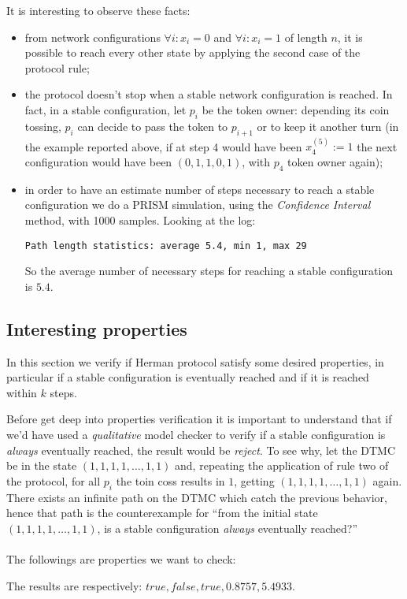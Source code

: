 It is interesting to observe these facts:
\begin{itemize}
\item from network configurations $\forall i:x_i=0$ and $\forall
  i:x_i=1$ of length $n$, it is possible to reach every other state by
  applying the second case of the protocol rule;
\item the protocol doesn't stop when a stable network configuration is
  reached. In fact, in a stable configuration, let $p_i$ be the token
  owner: depending its coin tossing, $p_i$ can decide to pass the
  token to $p_{i+1}$ or to keep it another turn (in the example
  reported above, if at step 4 would have been $x_4^{(5)}:= 1$ the
  next configuration would have been $(0, 1, 1, 0, 1)$, with $p_4$
  token owner again);
\item in order to have an estimate number of steps necessary to reach
  a stable configuration we do a PRISM simulation, using the
  \emph{Confidence Interval} method, with 1000 samples. Looking at the
  log:
\begin{verbatim}
Path length statistics: average 5.4, min 1, max 29
\end{verbatim}
  So the average number of necessary steps for reaching a stable
  configuration is $5.4$.
\end{itemize}

\subsection{Interesting properties}

In this section we verify if Herman protocol satisfy some desired
properties, in particular if a stable configuration is eventually
reached and if it is reached within $k$ steps.

Before get deep into properties verification it is important to
understand that if we'd have used a \emph{qualitative} model checker
to verify if a stable configuration is \emph{always} eventually
reached, the result would be \emph{reject}. To see why, let the DTMC
be in the state $(1,1,1,1,\ldots,1,1)$ and, repeating the application
of rule two of the protocol, for all $p_i$ the toin coss results in
$1$, getting $(1,1,1,1,\ldots,1,1)$ again. There exists an infinite
path on the DTMC which catch the previous behavior, hence that path is
the counterexample for ``from the initial state
$(1,1,1,1,\ldots,1,1)$, is a stable configuration \emph{always}
eventually reached?''
\\\\
The followings are properties we want to check:

The results are respectively: $true, false, true, 0.8757, 5.4933$.

